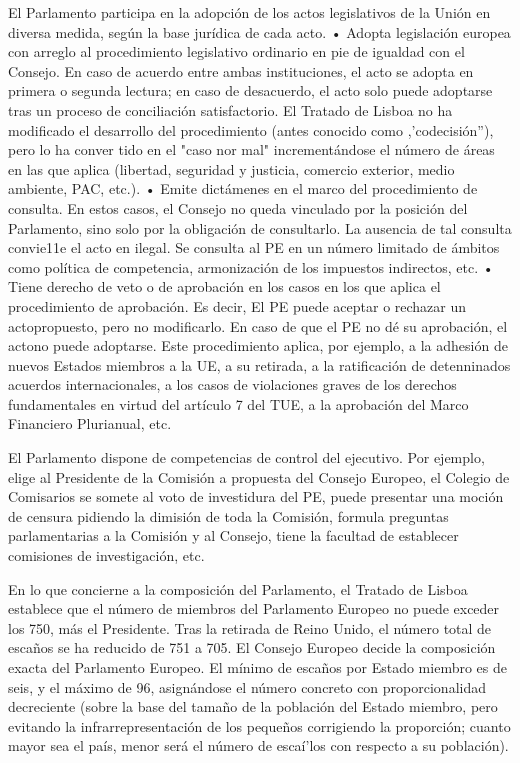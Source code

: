 \documentclass[10pt,a4paper]{article}
\begin{document}
El Parlamento participa en la adopción de los actos legislativos de la Unión en diversa medida, según la base jurídica de cada acto.
• Adopta legislación europea con arreglo al procedimiento legislativo ordinario en pie de igualdad con el Consejo. En caso de acuerdo entre ambas instituciones, el acto se adopta en primera o segunda lectura; en caso de desacuerdo, el acto solo puede adoptarse tras un proceso de conciliación satisfactorio. El Tratado de Lisboa no ha modificado el desarrollo del procedimiento (antes conocido como ,'codecisión''), pero lo ha conver tido en el "caso nor mal" incrementándose el número de áreas en las que aplica (libertad, seguridad y justicia, comercio exterior, medio ambiente, PAC, etc.). 
• Emite dictámenes en el marco del procedimiento de consulta. En estos casos, el Consejo no queda vinculado por la posición del Parlamento, sino solo por la obligación de consultarlo. La ausencia de tal consulta convie11e el acto en ilegal. Se consulta al PE en un número limitado de ámbitos como política de competencia, armonización de los impuestos indirectos, etc. 
• Tiene derecho de veto o de aprobación en los casos en los que aplica el procedimiento de aprobación. Es decir, El PE puede aceptar o rechazar un actopropuesto, pero no modificarlo. En caso de que el PE no dé su aprobación, el actono puede adoptarse. Este procedimiento aplica, por ejemplo, a la adhesión de nuevos Estados miembros a la UE, a su retirada, a la ratificación de detenninados acuerdos internacionales, a los casos de violaciones graves de los derechos fundamentales en virtud del artículo 7 del TUE, a la aprobación del Marco Financiero Plurianual, etc.



El Parlamento dispone de competencias de control del ejecutivo. Por ejemplo, elige al Presidente de la Comisión a propuesta del Consejo Europeo, el Colegio de Comisarios se somete al voto de investidura del PE, puede presentar una moción de censura pidiendo la dimisión de toda la Comisión, formula preguntas parlamentarias a la Comisión y al Consejo, tiene la facultad de establecer comisiones de investigación, etc.

En lo que concierne a la composición del Parlamento, el Tratado de Lisboa establece que el número de miembros del Parlamento Europeo no puede exceder los 750, más el Presidente. Tras la retirada de Reino Unido, el número total de escaños se ha reducido de 751 a 705. El Consejo Europeo decide la composición exacta del Parlamento Europeo. El mínimo de escaños por Estado miembro es de seis, y el máximo de 96, asignándose el número concreto con proporcionalidad decreciente (sobre la base del tamaño de la población del Estado miembro, pero evitando la infrarrepresentación de los pequeños corrigiendo la proporción; cuanto mayor sea el país, menor será el número de escaí'los con respecto a su población).
\end{document}
